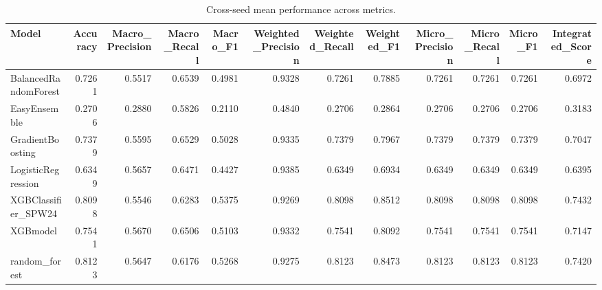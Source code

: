 \begin{table}[t]
\centering
\begin{tabular}{lrrrrrrrrrrr}
\toprule
Model & Accuracy & Macro_Precision & Macro_Recall & Macro_F1 & Weighted_Precision & Weighted_Recall & Weighted_F1 & Micro_Precision & Micro_Recall & Micro_F1 & Integrated_Score \\
\midrule
BalancedRandomForest & 0.7261 & 0.5517 & 0.6539 & 0.4981 & 0.9328 & 0.7261 & 0.7885 & 0.7261 & 0.7261 & 0.7261 & 0.6972 \\
EasyEnsemble & 0.2706 & 0.2880 & 0.5826 & 0.2110 & 0.4840 & 0.2706 & 0.2864 & 0.2706 & 0.2706 & 0.2706 & 0.3183 \\
GradientBoosting & 0.7379 & 0.5595 & 0.6529 & 0.5028 & 0.9335 & 0.7379 & 0.7967 & 0.7379 & 0.7379 & 0.7379 & 0.7047 \\
LogisticRegression & 0.6349 & 0.5657 & 0.6471 & 0.4427 & 0.9385 & 0.6349 & 0.6934 & 0.6349 & 0.6349 & 0.6349 & 0.6395 \\
XGBClassifier_SPW24 & 0.8098 & 0.5546 & 0.6283 & 0.5375 & 0.9269 & 0.8098 & 0.8512 & 0.8098 & 0.8098 & 0.8098 & 0.7432 \\
XGBmodel & 0.7541 & 0.5670 & 0.6506 & 0.5103 & 0.9332 & 0.7541 & 0.8092 & 0.7541 & 0.7541 & 0.7541 & 0.7147 \\
random_forest & 0.8123 & 0.5647 & 0.6176 & 0.5268 & 0.9275 & 0.8123 & 0.8473 & 0.8123 & 0.8123 & 0.8123 & 0.7420 \\
\bottomrule
\end{tabular}
\caption{Cross-seed mean performance across metrics.}
\label{tab:cross_seed_mean}
\end{table}